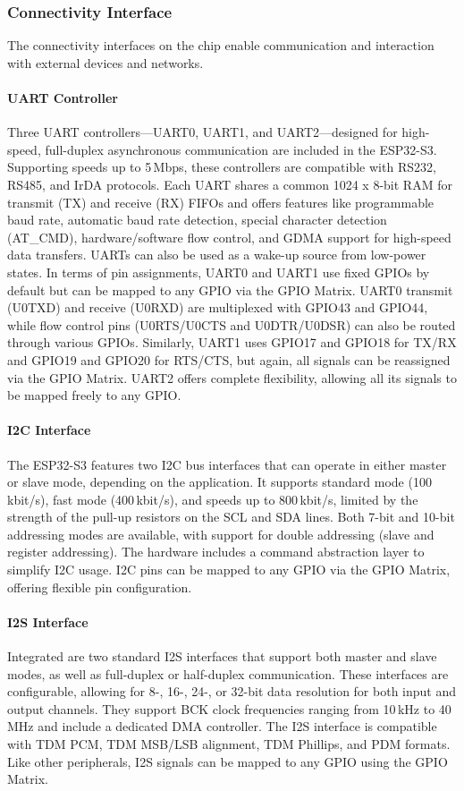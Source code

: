 \subsubsection{Connectivity Interface}
The connectivity interfaces on the chip enable communication and interaction with external devices and networks.

\paragraph{UART Controller}
Three UART controllers—UART0, UART1, and UART2—designed for high-speed, full-duplex asynchronous communication are included in the ESP32-S3. Supporting speeds up to 5\,Mbps, these controllers are compatible with RS232, RS485, and IrDA protocols. Each UART shares a common 1024 x 8-bit RAM for transmit (TX) and receive (RX) FIFOs and offers features like programmable baud rate, automatic baud rate detection, special character detection (AT\_CMD), hardware/software flow control, and GDMA support for high-speed data transfers. UARTs can also be used as a wake-up source from low-power states. In terms of pin assignments, UART0 and UART1 use fixed GPIOs by default but can be mapped to any GPIO via the GPIO Matrix. UART0 transmit (U0TXD) and receive (U0RXD) are multiplexed with GPIO43 and GPIO44, while flow control pins (U0RTS/U0CTS and U0DTR/U0DSR) can also be routed through various GPIOs. Similarly, UART1 uses GPIO17 and GPIO18 for TX/RX and GPIO19 and GPIO20 for RTS/CTS, but again, all signals can be reassigned via the GPIO Matrix. UART2 offers complete flexibility, allowing all its signals to be mapped freely to any GPIO.

\paragraph{I2C Interface}
The ESP32-S3 features two I2C bus interfaces that can operate in either master or slave mode, depending on the application. It supports standard mode (100\,kbit/s), fast mode (400\,kbit/s), and speeds up to 800\,kbit/s, limited by the strength of the pull-up resistors on the SCL and SDA lines. Both 7-bit and 10-bit addressing modes are available, with support for double addressing (slave and register addressing). The hardware includes a command abstraction layer to simplify I2C usage. I2C pins can be mapped to any GPIO via the GPIO Matrix, offering flexible pin configuration.

\paragraph{I2S Interface}
Integrated are two standard I2S interfaces that support both master and slave modes, as well as full-duplex or half-duplex communication. These interfaces are configurable, allowing for 8-, 16-, 24-, or 32-bit data resolution for both input and output channels. They support BCK clock frequencies ranging from 10\,kHz to 40\,MHz and include a dedicated DMA controller. The I2S interface is compatible with TDM PCM, TDM MSB/LSB alignment, TDM Phillips, and PDM formats. Like other peripherals, I2S signals can be mapped to any GPIO using the GPIO Matrix.

